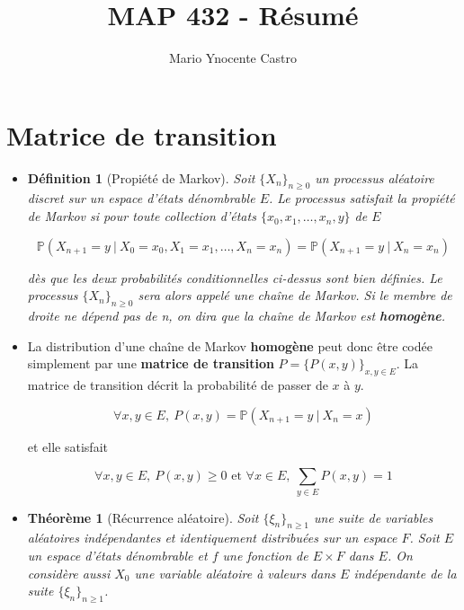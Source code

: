 \documentclass[10pt,a4paper,oneside]{article}
\newtheorem{theoreme}{Théorème}
\newtheorem{definition}{Définition}
\begin{document}
\title{MAP 432 - Résumé}
\author{Mario Ynocente Castro}

\maketitle

\section{Matrice de transition}

\begin{itemize}

\item
\begin{definition}[Propiété de Markov]
Soit $\{ X_n \}_{n \geq 0}$ un processus aléatoire discret sur un espace d'états dénombrable $E$. Le processus satisfait la propiété de Markov si pour toute collection d'états $\{ x_0,x_1,\ldots,x_n,y \}$ de $E$

\[ \boxed{ \mathbb{P}(X_{n + 1} = y\ |\ X_0 = x_0,X_1 = x_1,\ldots,X_n = x_n) = \mathbb{P}(X_{n + 1} = y\ |\ X_n = x_n) } \]

dès que les deux probabilités conditionnelles ci-dessus sont bien définies. Le processus $\{ X_n \}_{n \geq 0}$ sera alors appelé une chaîne de Markov. Si le membre de droite ne dépend pas de n, on dira que la chaîne de Markov est \textbf{homogène}.
\end{definition}

\item
La distribution d'une chaîne de Markov \textbf{homogène} peut donc être codée simplement par une \textbf{matrice de transition} $P = \{ P(x,y) \}_{x,y \in E}$. La matrice de transition décrit la probabilité de passer de $x$ à $y$.

\[ \boxed{ \forall x,y \in E,\ P(x,y) = \mathbb{P}(X_{n + 1} = y\ |\ X_n = x) } \]

et elle satisfait

\[ \forall x,y \in E,\ P(x,y) \geq 0 \text{ et } \forall x \in E,\ \sum_{y \in E} P(x,y) = 1 \]

\item
\begin{theoreme}[Récurrence aléatoire]
Soit $\{ \xi_n \}_{n \geq 1}$ une suite de variables aléatoires indépendantes et identiquement distribuées sur un espace $F$. Soit $E$ un espace d'états dénombrable et $f$ une fonction de $E \times F$ dans $E$. On considère aussi $X_0$ une variable aléatoire à valeurs dans $E$ indépendante de la suite $\{ \xi_n \}_{n \geq 1}$.


\end{theoreme}
\end{itemize}
\end{document}
